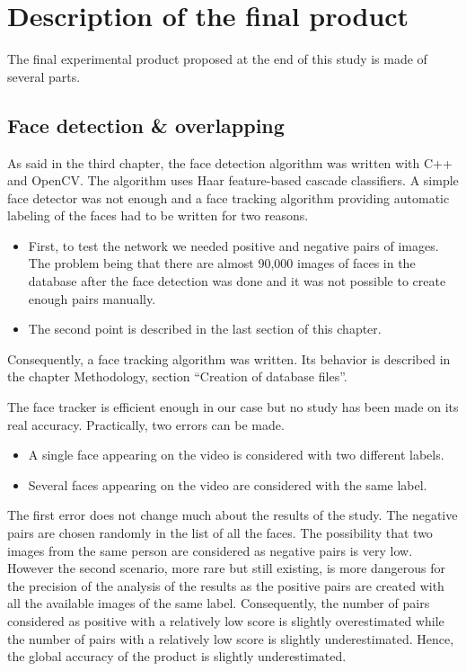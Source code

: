 \section{Description of the final product}

The final experimental product proposed at the end of this study is made of several parts.

\subsection{Face detection & overlapping}
As said in the third chapter, the face detection algorithm was written with C++ and OpenCV. The algorithm uses Haar feature-based cascade classifiers. A simple face detector was not enough and a face tracking algorithm providing automatic labeling of the faces had to be written for two reasons.
\begin{itemize}
\item First, to test the network we needed positive and negative pairs of images. The problem being that there are almost 90,000 images of faces in the database after the face detection was done and it was not possible to create enough pairs manually.
\item The second point is described in the last section of this chapter.
\end{itemize}
Consequently, a face tracking algorithm was written. Its behavior is described in the chapter Methodology, section \enquote{Creation of database files}.

The face tracker is efficient enough in our case but no study has been made on its real accuracy. Practically, two errors can be made.
\begin{itemize}
\item A single face appearing on the video is considered with two different labels.
\item Several faces appearing on the video are considered with the same label.
\end{itemize}

The first error does not change much about the results of the study. The negative pairs are chosen randomly in the list of all the faces. The possibility that two images from the same person are considered as negative pairs is very low. However the second scenario, more rare but still existing, is more dangerous for the precision of the analysis of the results as the positive pairs are created with all the available images of the same label. Consequently, the number of pairs considered as positive with a relatively low score is slightly overestimated while the number of pairs with a relatively low score is slightly underestimated. Hence, the global accuracy of the product is slightly underestimated.

